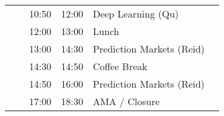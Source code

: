 \begin{longtable}{  p{0.5cm} l l l p{9cm}  c    }
    &        & 10:50 & 12:00 & Deep Learning (Qu)                                                &                   \\
    &        & 12:00 & 13:00 & Lunch                                                             &                   \\
    &        & 13:00 & 14:30 & Prediction Markets (Reid)                                         &                   \\
    &        & 14:30 & 14:50 & Coffee Break                                                      &                   \\
    &        & 14:50 & 16:00 & Prediction Markets (Reid)                                         &                   \\
    &        & 17:00 & 18:30 & AMA / Closure                                                     &          \\
    \bottomrule        
\end{longtable}





